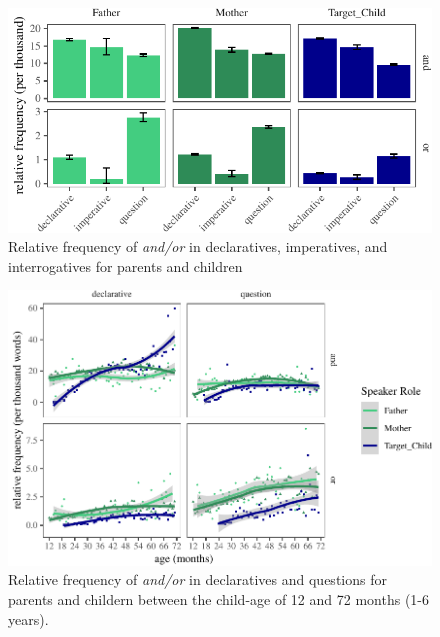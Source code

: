 \documentclass[,man,floatsintext]{apa6}
\begin{document}
\begin{figure}[tb]

{\centering \includegraphics{figs/freqTablebySpeechAct-1} 

}

\caption{Relative frequency of \textit{and/or} in declaratives, imperatives, and interrogatives for parents and children }\label{fig:freqTablebySpeechAct}
\end{figure}

\begin{figure}[tb]

{\centering \includegraphics{figs/ageSpeechActPlot-1} 

}

\caption{Relative frequency of \textit{and/or} in declaratives and questions for parents and childern between the child-age of 12 and 72 months (1-6 years).}\label{fig:ageSpeechActPlot}
\end{figure}
\end{document}
